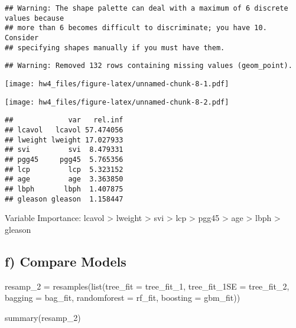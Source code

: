 \documentclass[
]{article}
\newenvironment{Shaded}{\begin{snugshade}}{\end{snugshade}}
\newcommand{\AttributeTok}[1]{\textcolor[rgb]{0.77,0.63,0.00}{#1}}
\newcommand{\DecValTok}[1]{\textcolor[rgb]{0.00,0.00,0.81}{#1}}
\newcommand{\FloatTok}[1]{\textcolor[rgb]{0.00,0.00,0.81}{#1}}
\newcommand{\FunctionTok}[1]{\textcolor[rgb]{0.00,0.00,0.00}{#1}}
\newcommand{\NormalTok}[1]{#1}
\newcommand{\OtherTok}[1]{\textcolor[rgb]{0.56,0.35,0.01}{#1}}
\newcommand{\SpecialCharTok}[1]{\textcolor[rgb]{0.00,0.00,0.00}{#1}}
\begin{document}
\begin{verbatim}
## Warning: The shape palette can deal with a maximum of 6 discrete values because
## more than 6 becomes difficult to discriminate; you have 10. Consider
## specifying shapes manually if you must have them.
\end{verbatim}

\begin{verbatim}
## Warning: Removed 132 rows containing missing values (geom_point).
\end{verbatim}

\texttt{[image: hw4\_files/figure-latex/unnamed-chunk-8-1.pdf]}

\begin{Shaded}
\end{Shaded}

\texttt{[image: hw4\_files/figure-latex/unnamed-chunk-8-2.pdf]}

\begin{verbatim}
##             var   rel.inf
## lcavol   lcavol 57.474056
## lweight lweight 17.027933
## svi         svi  8.479331
## pgg45     pgg45  5.765356
## lcp         lcp  5.323152
## age         age  3.363850
## lbph       lbph  1.407875
## gleason gleason  1.158447
\end{verbatim}

Variable Importance: lcavol \textgreater{} lweight \textgreater{} svi
\textgreater{} lcp \textgreater{} pgg45 \textgreater{} age
\textgreater{} lbph \textgreater{} gleason

\hypertarget{f-compare-models}{%
\subsection{f) Compare Models}\label{f-compare-models}}

\begin{Shaded}
\begin{Highlighting}[]
\NormalTok{resamp\_2 }\OtherTok{=} \FunctionTok{resamples}\NormalTok{(}\FunctionTok{list}\NormalTok{(}\AttributeTok{tree\_fit =}\NormalTok{ tree\_fit\_1, }
                          \AttributeTok{tree\_fit\_1SE =}\NormalTok{ tree\_fit\_2,}
                          \AttributeTok{bagging =}\NormalTok{ bag\_fit,}
                          \AttributeTok{randomforest =}\NormalTok{ rf\_fit,}
                          \AttributeTok{boosting =}\NormalTok{ gbm\_fit))}

\FunctionTok{summary}\NormalTok{(resamp\_2)}
\end{Highlighting}
\end{Shaded}
\end{document}

